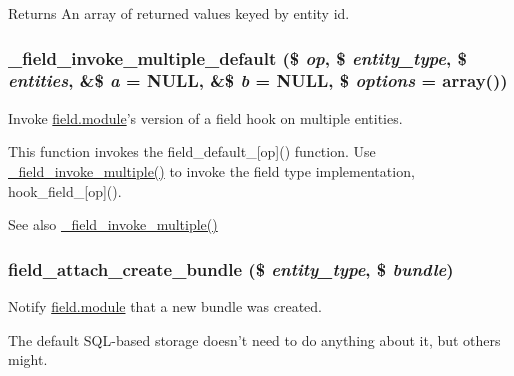 \begin{DoxyReturn}{Returns}
An array of returned values keyed by entity id. 
\end{DoxyReturn}
\hypertarget{group__field__attach_gae25199cb48ebcbe016ed158985c755ef}{
\subsubsection[{\_\-field\_\-invoke\_\-multiple\_\-default}]{\setlength{\rightskip}{0pt plus 5cm}\_\-field\_\-invoke\_\-multiple\_\-default (\$ {\em op}, \/  \$ {\em entity\_\-type}, \/  \$ {\em entities}, \/  \&\$ {\em a} = {\ttfamily NULL}, \/  \&\$ {\em b} = {\ttfamily NULL}, \/  \$ {\em options} = {\ttfamily array()})}}
\label{group__field__attach_gae25199cb48ebcbe016ed158985c755ef}
Invoke \hyperlink{field_8module}{field.module}'s version of a field hook on multiple entities.

This function invokes the field\_\-default\_\-\mbox{[}op\mbox{]}() function. Use \hyperlink{group__field__attach_ga791aeba11e29038daf3e798dbea0df60}{\_\-field\_\-invoke\_\-multiple()} to invoke the field type implementation, hook\_\-field\_\-\mbox{[}op\mbox{]}().

\begin{DoxySeeAlso}{See also}
\hyperlink{group__field__attach_ga791aeba11e29038daf3e798dbea0df60}{\_\-field\_\-invoke\_\-multiple()} 
\end{DoxySeeAlso}
\hypertarget{group__field__attach_gab3649772ef7a6416b013a4a556ce51bf}{
\subsubsection[{field\_\-attach\_\-create\_\-bundle}]{\setlength{\rightskip}{0pt plus 5cm}field\_\-attach\_\-create\_\-bundle (\$ {\em entity\_\-type}, \/  \$ {\em bundle})}}
\label{group__field__attach_gab3649772ef7a6416b013a4a556ce51bf}
Notify \hyperlink{field_8module}{field.module} that a new bundle was created.

The default SQL-\/based storage doesn't need to do anything about it, but others might.


